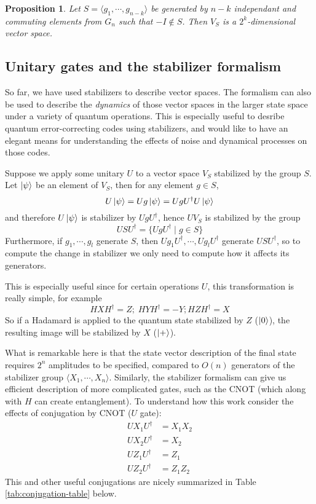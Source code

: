 \documentclass[11pt,a4paper]{article}
\theoremstyle{definition}
\theoremstyle{plain}
\newtheorem{proposition}[definition]{Proposition}
\theoremstyle{remark}
\begin{document}
\begin{proposition}
    Let $S = \langle g_1, \cdots, g_{n-k}\rangle$ be generated by $n -k$ independant and commuting elements 
    from $G_n$ such that $-I \not\in S$. Then $V_S$ is a $2^k$-dimensional vector space. 
\end{proposition}

\subsection{Unitary gates and the stabilizer formalism} 
So far, we have used stabilizers to describe vector spaces. The formalism 
can also be used to describe the \emph{dynamics} of those vector spaces  in 
the larger state space under a variety of quantum operations. 
This is especially useful to desribe quantum error-correcting codes using stabilizers, and would like to have 
an elegant means for understanding the effects of noise and dynamical processes on those codes. 

Suppose we apply some unitary $U$ to a vector space $V_S$ stabilized by the group $S$. Let $\ket{\psi}$ be an element of $V_S$, 
then for any element $g \in S$, 
$$U \ket{\psi} = U g \ket{\psi} = U g U^\dagger U \ket{\psi}$$
and therefore $U \ket{\psi}$ is stabilizer by $U g U^\dagger$, hence $U V_S$ is stabilized by the group 
$$USU^\dagger = \{U g U^\dagger \mid g \in S\}$$ 
Furthermore, if $g_1, \cdots, g_l$ generate $S$, then $U g_1 U^\dagger, \cdots, U g_l U^\dagger$ generate $U S U^\dagger$, 
so to compute the change in stabilizer we only need to compute how it affects its generators. 

This is especially useful since for certain operations $U$, this transformation is really simple, for example 
$$H X H^\dagger = Z; \; HYH^\dagger = -Y; HZH^\dagger = X$$
So if a Hadamard is applied to the quantum state stabilized by $Z$ ($\ket{0}$), the resulting image will be stabilized by $X$ ($\ket{+}$). 

What is remarkable here is that the state vector description of the final state requires $2^n$ amplitudes to be specified, compared 
to $O(n)$ generators of the stabilizer group $\langle X_1, \cdots, X_n\rangle$. 
Similarly, the stabilizer formalism can give us efficient description of more complicated gates, such as the CNOT (which along with $H$ can create 
entanglement). To understand how this work consider the effects of conjugation by CNOT ($U$ gate): 
\begin{align}
    U X_1 U^\dagger &= X_1 X_2 \\
    U X_2 U^\dagger &= X_2 \\
    U Z_1 U^\dagger &= Z_1 \\
    U Z_2 U^\dagger &= Z_1 Z_2 
\end{align}
This and other useful conjugations are nicely summarized in Table \ref{tab:conjugation-table} below. 
\end{document}
